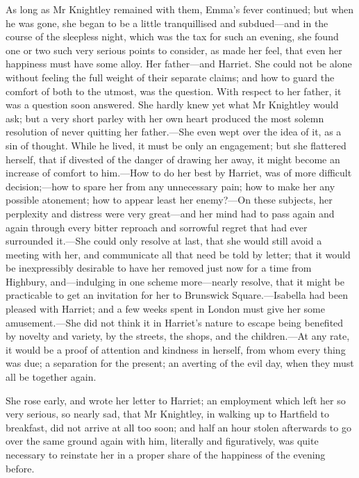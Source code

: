 As long as Mr Knightley remained with them, Emma's fever continued; but when he was gone, she began to be a little tranquillised and subdued—and in the course of the sleepless night, which was the tax for such an evening, she found one or two such very serious points to consider, as made her feel, that even her happiness must have some alloy. Her father—and Harriet. She could not be alone without feeling the full weight of their separate claims; and how to guard the comfort of both to the utmost, was the question. With respect to her father, it was a question soon answered. She hardly knew yet what Mr Knightley would ask; but a very short parley with her own heart produced the most solemn resolution of never quitting her father.—She even wept over the idea of it, as a sin of thought. While he lived, it must be only an engagement; but she flattered herself, that if divested of the danger of drawing her away, it might become an increase of comfort to him.—How to do her best by Harriet, was of more difficult decision;—how to spare her from any unnecessary pain; how to make her any possible atonement; how to appear least her enemy?—On these subjects, her perplexity and distress were very great—and her mind had to pass again and again through every bitter reproach and sorrowful regret that had ever surrounded it.—She could only resolve at last, that she would still avoid a meeting with her, and communicate all that need be told by letter; that it would be inexpressibly desirable to have her removed just now for a time from Highbury, and—indulging in one scheme more—nearly resolve, that it might be practicable to get an invitation for her to Brunswick Square.—Isabella had been pleased with Harriet; and a few weeks spent in London must give her some amusement.—She did not think it in Harriet's nature to escape being benefited by novelty and variety, by the streets, the shops, and the children.—At any rate, it would be a proof of attention and kindness in herself, from whom every thing was due; a separation for the present; an averting of the evil day, when they must all be together again.

She rose early, and wrote her letter to Harriet; an employment which left her so very serious, so nearly sad, that Mr Knightley, in walking up to Hartfield to breakfast, did not arrive at all too soon; and half an hour stolen afterwards to go over the same ground again with him, literally and figuratively, was quite necessary to reinstate her in a proper share of the happiness of the evening before.

